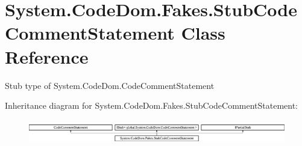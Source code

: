 \hypertarget{class_system_1_1_code_dom_1_1_fakes_1_1_stub_code_comment_statement}{\section{System.\-Code\-Dom.\-Fakes.\-Stub\-Code\-Comment\-Statement Class Reference}
\label{class_system_1_1_code_dom_1_1_fakes_1_1_stub_code_comment_statement}
}


Stub type of System.\-Code\-Dom.\-Code\-Comment\-Statement 


Inheritance diagram for System.\-Code\-Dom.\-Fakes.\-Stub\-Code\-Comment\-Statement\-:\begin{figure}[H]
\begin{center}
\leavevmode
\includegraphics[height=1.072797cm]{class_system_1_1_code_dom_1_1_fakes_1_1_stub_code_comment_statement}
\end{center}
\end{figure}
